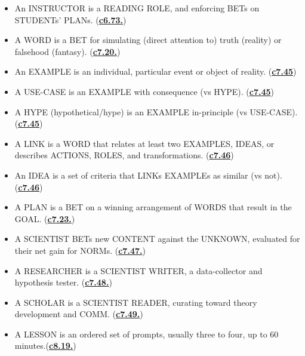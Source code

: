 \documentclass[
]{book}
\begin{document}
\begin{itemize}
\item
  An INSTRUCTOR is a READING ROLE, and enforcing BETs on STUDENTs' PLANs. (\protect\hyperlink{instructor}{\textbf{c6.73.}})\\
\item
  A WORD is a BET for simulating (direct attention to) truth (reality) or falsehood (fantasy). (\protect\hyperlink{word-as-bet}{\textbf{c7.20.}})\\
\item
  An EXAMPLE is an individual, particular event or object of reality. (\protect\hyperlink{example-and-idea}{\textbf{c7.45}})\\
\item
  A USE-CASE is an EXAMPLE with consequence (vs HYPE). (\protect\hyperlink{example-and-idea}{\textbf{c7.45}})\\
\item
  A HYPE (hypothetical/hype) is an EXAMPLE in-principle (vs USE-CASE).(\protect\hyperlink{example-and-idea}{\textbf{c7.45}})\\
\item
  A LINK is a WORD that relates at least two EXAMPLES, IDEAS, or describes ACTIONS, ROLES, and transformations. (\protect\hyperlink{example-and-idea}{\textbf{c7.46}})\\
\item
  An IDEA is a set of criteria that LINKs EXAMPLEs as similar (vs not). (\protect\hyperlink{example-and-idea}{\textbf{c7.46}})\\
\item
  A PLAN is a BET on a winning arrangement of WORDS that result in the GOAL. (\protect\hyperlink{word-as-bet}{\textbf{c7.23.}})\\
\item
  A SCIENTIST BETs new CONTENT against the UNKNOWN, evaluated for their net gain for NORMs. (\protect\hyperlink{role-scientist}{\textbf{c7.47.}})\\
\item
  A RESEARCHER is a SCIENTIST WRITER, a data-collector and hypothesis tester. (\protect\hyperlink{role-scientist}{\textbf{c7.48.}})\\
\item
  A SCHOLAR is a SCIENTIST READER, curating toward theory development and COMM. (\protect\hyperlink{role-scientist}{\textbf{c7.49.}})\\
\item
  A LESSON is an ordered set of prompts, usually three to four, up to 60 minutes.(\protect\hyperlink{lessons-1}{\textbf{c8.19.}})\\

\end{itemize}
\end{document}
